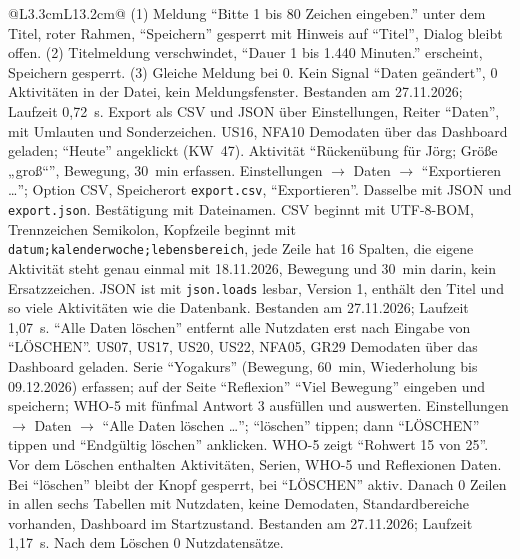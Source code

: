 \begin{longtable}{@{}L{3.3cm}L{13.2cm}@{}}
    {(1) Meldung \enquote{Bitte 1 bis 80 Zeichen eingeben.} unter dem Titel, roter Rahmen, \enquote{Speichern} gesperrt mit Hinweis auf \enquote{Titel}, Dialog bleibt offen. (2) Titelmeldung verschwindet, \enquote{Dauer 1 bis 1.440 Minuten.} erscheint, Speichern gesperrt. (3) Gleiche Meldung bei 0. Kein Signal \enquote{Daten geändert}, 0 Aktivitäten in der Datei, kein Meldungsfenster.}
    {Bestanden am 27.11.2026; Laufzeit 0,72~s.}
  \midrule
    {Export als CSV und JSON über Einstellungen, Reiter \enquote{Daten}, mit Umlauten und Sonderzeichen.}
    {US16, NFA10}
    {}
    {Demodaten über das Dashboard geladen; \enquote{Heute} angeklickt (KW~47).}
    {Aktivität \enquote{Rückenübung für Jörg; Größe „groß“}, Bewegung, 30~min erfassen. Einstellungen $\rightarrow$ Daten $\rightarrow$ \enquote{Exportieren \dots}; Option CSV, Speicherort \texttt{export.csv}, \enquote{Exportieren}. Dasselbe mit JSON und \texttt{export.json}.}
    {Bestätigung mit Dateinamen. CSV beginnt mit UTF-8-BOM, Trennzeichen Semikolon, Kopfzeile beginnt mit \texttt{datum;kalenderwoche;lebensbereich}, jede Zeile hat 16 Spalten, die eigene Aktivität steht genau einmal mit 18.11.2026, Bewegung und 30~min darin, kein Ersatzzeichen. JSON ist mit \texttt{json.loads} lesbar, Version 1, enthält den Titel und so viele Aktivitäten wie die Datenbank.}
    {Bestanden am 27.11.2026; Laufzeit 1,07~s.}
  \midrule
    {\enquote{Alle Daten löschen} entfernt alle Nutzdaten erst nach Eingabe von \enquote{LÖSCHEN}.}
    {US07, US17, US20, US22, NFA05, GR29}
    {}
    {Demodaten über das Dashboard geladen.}
    {Serie \enquote{Yogakurs} (Bewegung, 60~min, Wiederholung bis 09.12.2026) erfassen; auf der Seite \enquote{Reflexion} \enquote{Viel Bewegung} eingeben und speichern; WHO-5 mit fünfmal Antwort 3 ausfüllen und auswerten. Einstellungen $\rightarrow$ Daten $\rightarrow$ \enquote{Alle Daten löschen \dots}; \enquote{löschen} tippen; dann \enquote{LÖSCHEN} tippen und \enquote{Endgültig löschen} anklicken.}
    {WHO-5 zeigt \enquote{Rohwert 15 von 25}. Vor dem Löschen enthalten Aktivitäten, Serien, WHO-5 und Reflexionen Daten. Bei \enquote{löschen} bleibt der Knopf gesperrt, bei \enquote{LÖSCHEN} aktiv. Danach 0 Zeilen in allen sechs Tabellen mit Nutzdaten, keine Demodaten, Standardbereiche vorhanden, Dashboard im Startzustand.}
    {Bestanden am 27.11.2026; Laufzeit 1,17~s. Nach dem Löschen 0 Nutzdatensätze.}
  \midrule

\end{longtable}

